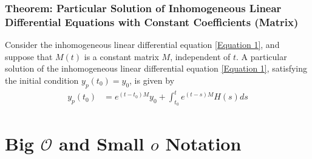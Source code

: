 \documentclass[11pt]{elegantbook}
\begin{document}
\subsection{Theorem: Particular Solution of Inhomogeneous Linear Differential Equations with Constant Coefficients (Matrix)}
\begin{theorem}
    Consider the inhomogeneous linear differential equation \ref{Equation 1}, and suppose that $M(t)$ is a constant matrix $M$, independent of $t$. A particular solution of the inhomogeneous linear differential equation \ref{Equation 1}, satisfying the initial condition $y_p(t_0) = y_0$, is given by
    \begin{equation}
        \begin{aligned}
            y_p(t_0)&=e^{(t-t_0)M}y_0+\int_{t_0}^t e^{(t-s)M} H(s) ds
        \end{aligned}
        \tag{3}
        \label{Equation 3}
    \end{equation}
\end{theorem}


\chapter{Big $\mathcal{O}$ and Small $o$ Notation}
\end{document}
